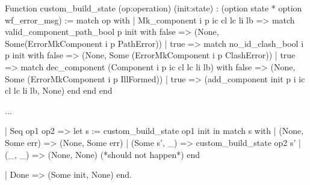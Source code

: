 Function custom_build_state (op:operation) (init:state) 
                       : (option state * option wf_error_msg) :=
 match op with
  | Mk_component i p ic cl lc li lb => 
     match valid_component_path_bool p init with
       false => (None, Some(ErrorMkComponent i p PathError))
     | true => 
        match no_id_clash_bool i p init with
          false => (None, Some (ErrorMkComponent i p ClashError))
        | true  => 
           match dec_component (Component i p ic cl lc li lb) with
             false => (None, Some (ErrorMkComponent i p IllFormed))
           | true => (add_component init p i ic cl lc li lb, None)
           end
        end
     end
     
 ...
     
 | Seq    op1 op2              =>
    let s := custom_build_state op1 init in
    match s with
     | (None, Some err)    => (None, Some err)
     | (Some s', _)  => custom_build_state op2 s'
     | (_, _)          => (None, None) (*should not happen*)
    end
       
 | Done                        => (Some init, None)
end.